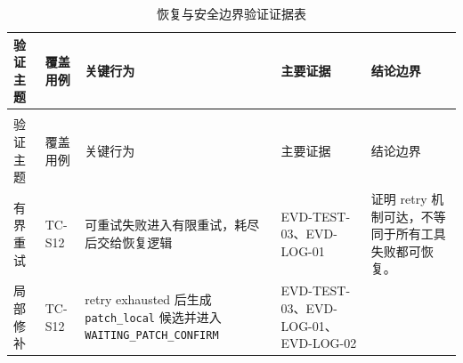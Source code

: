{%
\begin{longtable}{@{}
  >{\centering\arraybackslash}p{}
  >{\centering\arraybackslash}p{}
  >{\centering\arraybackslash}p{}
  >{\centering\arraybackslash}p{}
  >{\centering\arraybackslash}p{}@{}}
\caption{恢复与安全边界验证证据表}\label{tab:6-4}\\
\toprule
\begin{minipage}[b]{\linewidth}\centering
验证主题
\end{minipage} & \begin{minipage}[b]{\linewidth}\centering
覆盖用例
\end{minipage} & \begin{minipage}[b]{\linewidth}\centering
关键行为
\end{minipage} & \begin{minipage}[b]{\linewidth}\centering
主要证据
\end{minipage} & \begin{minipage}[b]{\linewidth}\centering
结论边界
\end{minipage} \\
\midrule
\endfirsthead
\multicolumn{5}{r}{表\thetable（续表）} \\
\toprule
\begin{minipage}[b]{\linewidth}\centering
验证主题
\end{minipage} & \begin{minipage}[b]{\linewidth}\centering
覆盖用例
\end{minipage} & \begin{minipage}[b]{\linewidth}\centering
关键行为
\end{minipage} & \begin{minipage}[b]{\linewidth}\centering
主要证据
\end{minipage} & \begin{minipage}[b]{\linewidth}\centering
结论边界
\end{minipage} \\
\midrule
\endhead
\midrule
\endfoot
\bottomrule
\endlastfoot
有界重试 & TC-S12 & 可重试失败进入有限重试，耗尽后交给恢复逻辑 &
EVD-TEST-03、EVD-LOG-01 & 证明 retry
机制可达，不等同于所有工具失败都可恢复。 \\
局部修补 & TC-S12 & retry exhausted 后生成 \texttt{patch\_local}
候选并进入 \texttt{WAITING\_PATCH\_CONFIRM} &
EVD-TEST-03、EVD-LOG-01、EVD-LOG-02 &

\end{longtable}}
